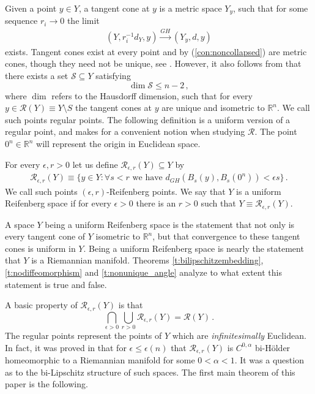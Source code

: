 \documentclass[11pt]{article}
\newcommand{\RR}{\mathds{R}}
\newcommand{\cS}{\mathcal{S}}
\newcommand{\cR}{\mathcal{R}}
\begin{document}
Given a point $y\in Y$, a tangent cone at $y$ is a metric space $Y_y$, such that for some sequence $r_i\rightarrow 0$ the limit
\begin{align}
 (Y,r_i^{-1}d_Y,y)\stackrel{GH}{\rightarrow}(Y_y,d,y)
\end{align}
exists.  Tangent cones exist at every point and by (\ref{con:noncollapsed}) are metric cones, though they need not be unique, see \cite{ChC2}.  However, it also follows from \cite{ChC2} that there exists a set $\cS\subseteq Y$ satisfying
$$
\dim \cS\leq n-2\, ,
$$
where $\dim$ refers to the Hausdorff dimension, such that for every $y\in \cR(Y)\equiv Y\setminus S$ the tangent cones at $y$ are unique and isometric to $\RR^n$.  We call such points regular points.  The following definition is a uniform version of a regular point, and makes for a convenient notion when studying $\cR$.  The point $0^n\in\RR^n$ will represent the origin in Euclidean space.

\begin{definition}
 For every $\epsilon,r>0$ let us define $\cR_{\epsilon,r}(Y)\subseteq Y$ by
\begin{align}
 \cR_{\epsilon,r}(Y)\equiv\{y\in Y: \forall s<r\text{ we have }d_{GH}(B_s(y),B_s(0^n))<\epsilon s\}\, .
\end{align}
We call such points $(\epsilon,r)$-Reifenberg points.  We say that $Y$ is a uniform Reifenberg space if for every $\epsilon>0$ there is an $r>0$ such that  $Y\equiv \cR_{\epsilon,r}(Y)$.
\end{definition}

A space $Y$ being a uniform Reifenberg space is the statement that not only is every tangent cone of $Y$ isometric to $\RR^n$, but that convergence to these tangent cones is uniform in $Y$.  Being a uniform Reifenberg space is nearly the statement that $Y$ is a Riemannian manifold.  Theorems \ref{t:bilipschitzembedding}, \ref{t:nodiffeomorphism} and \ref{t:nonunique_angle} analyze to what extent this statement is true and false.

A basic property of $\cR_{\epsilon,r}(Y)$ is that
$$
\bigcap_{\epsilon>0}\bigcup_{r>0}\cR_{\epsilon,r}(Y) = \cR(Y)\, .
$$
The regular points represent the points of $Y$ which are {\it infinitesimally} Euclidean.  In fact, it was proved in \cite{ChC2} that for $\epsilon\leq \epsilon(n)$ that $\cR_{\epsilon,r}(Y)$ is $C^{0,\alpha}$ bi-H\"older homeomorphic to a Riemannian manifold for some $0<\alpha<1$.  It was a question as to the bi-Lipschitz structure of such spaces.  The first main theorem of this paper is the following.
\end{document}
